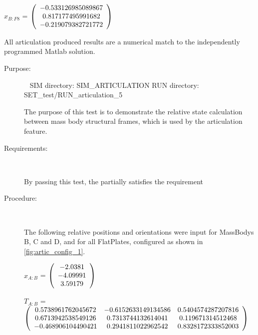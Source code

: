 \begin{description}
$\hat{x}_{B:F8}$  = $\left( \begin{array} {ccc} -0.533126985089867 \\ 0.817177495991682 \\ -0.219079382721772
\end{array} \right)\\ \\$

All \ModelDesc articulation produced results are a numerical match to the
independently programmed Matlab solution.


\end{description}

\label{test:art_test_5}

\begin{description}

\item[Purpose:] \ \newline
SIM directory: SIM\_ARTICULATION
RUN directory: SET\_test/RUN\_articulation\_5

The purpose of this test is to demonstrate the relative state calculation
between mass body structural frames, which is used by the articulation
feature.

\item[Requirements:] \ \newline

By passing this test, the \ModelDesc partially satisfies
the requirement 

\item[Procedure:] \ \newline

The following relative positions and orientations were input for MassBodys
B, C and D, and for all FlatPlates, configured as shown in
\ref{fig:artic_config_1}.

$x_{A:B}$ = $\left( \begin{array} {ccc}    -2.0381 \\   -4.09991 \\    3.59179 
\end{array} \right)\\ \\$

$T_{A:B}$ = $\left( \begin{array} {ccc} 
   0.5738961762045672 & -0.6152633149134586 & 0.5404574287207816 \\ 
   0.6713942538549126 & 0.7313744132614041 & 0.119671314512468 \\ 
   -0.468906104490421 & 0.2941811022962542 & 0.8328172333852003 \\
\end{array} \right)\\ \\$


\end{description}
